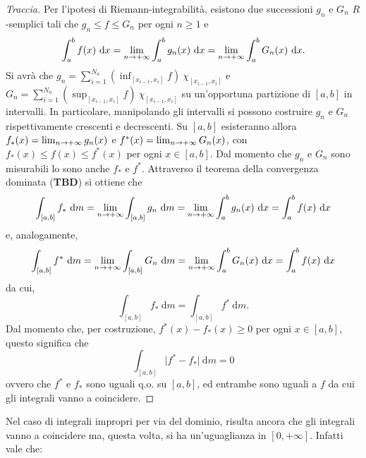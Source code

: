 \documentclass[Completo.tex]{subfiles}
\begin{document}
	\begin{proof}[Traccia]
		Per l'ipotesi di Riemann-integrabilità, esistono due successioni $g_n$ e $G_n$ $R$-semplici tali che $g_n \leq f \leq G_n$ per ogni $n \geq 1$ e
		\begin{equation*}
		\int_{a}^{b} f(x) \ \mathrm{d}x = \lim_{n \rightarrow +\infty} \int_{a}^{b} g_n(x) \ \mathrm{d}x = \lim_{n \rightarrow +\infty} \int_{a}^{b} G_n(x) \ \mathrm{d}x.
		\end{equation*}
		Si avrà che $g_n = \sum_{i = 1}^{N_n} (\inf_{[x_{i-1}, x_i]} f) \ \chi_{[x_{i-1}, x_i]}$ e $G_n = \sum_{i = 1}^{N_n} (\sup_{[x_{i-1}, x_i]} f) \ \chi_{[x_{i-1}, x_i]}$ su un'opportuna partizione di $[a,b]$ in intervalli. In particolare, manipolando gli intervalli si possono costruire $g_n$ e $G_n$ rispettivamente crescenti e decrescenti. Su $[a,b]$ esisteranno allora $f_{*}(x) = \lim_{n \rightarrow +\infty} g_n(x)$ e $f^{*}(x) = \lim_{n \rightarrow +\infty} G_n(x)$, con $f_{*}(x) \leq f(x) \leq f^{*}(x)$ per ogni $x \in [a,b]$. Dal momento che $g_n$ e $G_n$ sono misurabili lo sono anche $f_{*}$ e $f^{*}$. Attraverso il teorema della convergenza dominata (\textbf{TBD}) si ottiene che
		\begin{equation*}
		\int_{[a,b]} f_{*} \ \mathrm{d}m = \lim_{n \ra +\infty} \int_{[a,b]} g_n \ \mathrm{d}m = \lim_{n \ra +\infty} \int_{a}^{b} g_n(x) \ \mathrm{d}x = \int_{a}^{b} f(x) \ \mathrm{d}x
		\end{equation*}
		e, analogamente,
		\begin{equation*}
		\int_{[a,b]} f^{*} \ \mathrm{d}m = \lim_{n \ra +\infty} \int_{[a,b]} G_n \ \mathrm{d}m = \lim_{n \ra +\infty} \int_{a}^{b} G_n(x) \ \mathrm{d}x = \int_{a}^{b} f(x) \ \mathrm{d}x
		\end{equation*}
		da cui,
		\begin{equation*}
		\int_{[a,b]} f_{*} \ \mathrm{d}m = \int_{[a,b]} f^{*} \ \mathrm{d}m.
		\end{equation*}
		Dal momento che, per costruzione, $f^{*}(x) - f_{*}(x) \geq 0$ per ogni $x \in [a,b]$, questo significa che
		\begin{equation*}
		\int_{[a,b]} \vert f^{*} - f_{*} \vert \ \mathrm{d}m = 0
		\end{equation*}
		ovvero che $f^{*}$ e $f_{*}$ sono uguali q.o. su $[a,b]$, ed entrambe sono uguali a $f$ da cui gli integrali vanno a coincidere.
	\end{proof}
	Nel caso di integrali impropri per via del dominio, risulta ancora che gli integrali vanno a coincidere ma, questa volta, si ha un'uguaglianza in $[0, +\infty]$. Infatti vale che:
\end{document}
